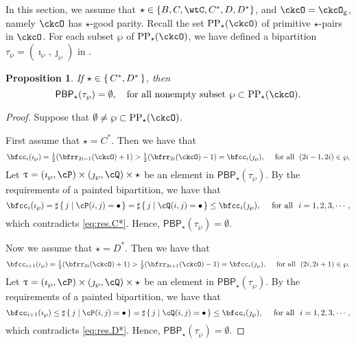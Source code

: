 \documentclass[12pt,a4paper]{amsart}
\numberwithin{equation}{section}
\newtheorem{prop}[thm]{Proposition}
\theoremstyle{remark}
\def\half{{\tfrac{1}{2}}}
\def\CPPs{\mathrm{PP}_{\star}}
\def\PBP{\mathsf{PBP}}
\def\ckcOg{\ckcO_{\mathrm g}}
\begin{document}
In this section, we assume that $\star \in \{B,C,\wtC,C^{*},D,D^{*}\}$, and $\ckcO = \ckcOg$, namely $\ckcO $ has $\star$-good parity.
Recall the set  $\CPPs(\ckcO)$ of primitive $\star$-pairs in $\ckcO$. For each subset $\wp$ of $\CPPs(\ckcO)$, we have defined a bipartition $\tau_{\wp}=(\imath_{\wp},\jmath_{\wp})$ in .

\begin{prop} \label{prop:PBP} If $\star\in \set{C^{*}, D^{*}}$, then
  \[
    \PBP_{\star}(\tau_{\wp}) = \emptyset, \quad \text{for all nonempty subset   $\wp\subset \CPPs(\ckcO)$.}
  \]
\end{prop}
\begin{proof}
Suppose that
  $\emptyset\neq \wp\subset \CPPs(\ckcO)$.
  
   First assume that  $\star = C^{*}$. Then we have that 
  \begin{equation}\label{eq:res.C*}
    \bfcc_{i}(\imath_{\wp}) = \half(\bfrr_{2i-1}(\ckcO)+1)>
    \half(\bfrr_{2i}(\ckcO)-1) = \bfcc_{i}(\jmath_{\wp}),
    \quad \textrm{ for all } \,\, (2i-1, 2i)\in \wp,
  \end{equation}
  Let $\uptau = (\imath_{\wp}, \cP)\times (\jmath_{\wp},\cQ)\times \star$ be an element in $\PBP_{\star}(\tau_{\wp})$. By the requirements of a painted bipartition, we have that
  \[
    \bfcc_{i}(\imath_{\wp}) = \sharp\set{j| \cP(i,j)=\bullet} = \sharp\set{j| \cQ(i,j)=\bullet} \leq \bfcc_{i}(\jmath_{\wp}), \quad \textrm{ for all } \,\, i=1,2,3,\cdots,
  \]
  which contradicts \eqref{eq:res.C*}. Hence, $\PBP_{\star}(\tau_{\wp})= \emptyset$.



  Now we assume that $\star = D^{*}$. 
  Then we have that
  \begin{equation}\label{eq:res.D*}
    \bfcc_{i+1}(\imath_{\wp}) = \half(\bfrr_{2i}(\ckcO)+1)>
    \half(\bfrr_{2i+1}(\ckcO)-1) = \bfcc_{i}(\jmath_{\wp}),
    \quad \textrm{ for all } \,\, (2i, 2i+1)\in \wp.
  \end{equation}
  Let $\uptau = (\imath_{\wp}, \cP)\times (\jmath_{\wp},\cQ)\times \star$ be an element in $\PBP_{\star}(\tau_{\wp})$. By the requirements of a painted bipartition, we have that
  \[
    \bfcc_{i+1}(\imath_{\wp}) \leq \sharp\set{j| \cP(i,j)=\bullet} =\sharp\set{j| \cQ(i,j)=\bullet} \leq \bfcc_{i}(\jmath_{\wp}), \quad \textrm{ for all } \,\, i = 1,2,3, \cdots,
  \]
  which contradicts \eqref{eq:res.D*}. Hence, $\PBP_{\star}(\tau_{\wp})= \emptyset$.

\end{proof}
\end{document}
